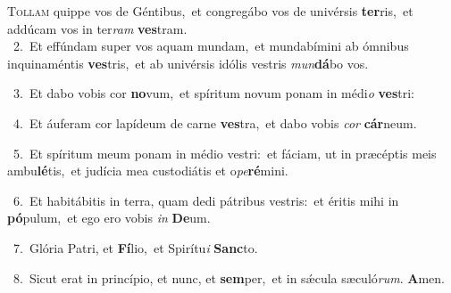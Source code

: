 \lettrine{\initial\textcolor{\initialcolor}{T}}{ollam} quippe vos de Géntibus,~\dagger et congregábo vos de univérsis \textbf{ter}\-ris,~\star et addúcam vos in ter\textit{ram} \textbf{ves}\-tram.\\
{\numbfont\textcolor{\numbcolor}{~2.}}~Et effúndam super vos aquam mundam,~\dagger et mundabímini ab ómnibus inquinaméntis \textbf{ves}\-tris,~\star et ab univérsis idólis vestris \textit{mun}\-\textbf{dá}bo vos.\par
{\numbfont\textcolor{\numbcolor}{~3.}}~Et dabo vobis cor \textbf{no}\-vum,~\star et spíritum novum ponam in médi\textit{o} \textbf{ves}\-tri:\par
{\numbfont\textcolor{\numbcolor}{~4.}}~Et áuferam cor lapídeum de carne \textbf{ves}\-tra,~\star et dabo vobis \textit{cor} \textbf{cár}\-neum.\par
{\numbfont\textcolor{\numbcolor}{~5.}}~Et spíritum meum ponam in médio vestri:~\dagger et fáciam, ut in præcéptis meis ambu\-\textbf{lé}\-tis,~\star et judícia mea custodiátis et o\-\textit{pe}\-\textbf{ré}mini.\par
{\numbfont\textcolor{\numbcolor}{~6.}}~Et habitábitis in terra, quam dedi pátribus vestris:~\dagger et éritis mihi in \textbf{pó}\-pulum,~\star et ego ero vobis \textit{in} \textbf{De}\-um.\par
{\numbfont\textcolor{\numbcolor}{~7.}}~Glória Patri, et \textbf{Fí}\-lio,~\star et Spirítu\textit{i} \textbf{Sanc}\-to.\par
{\numbfont\textcolor{\numbcolor}{~8.}}~Sicut erat in princípio, et nunc, et \textbf{sem}\-per,~\star et in sǽcula sæculó\-\textit{rum}\-. \textbf{A}\-men.\par
